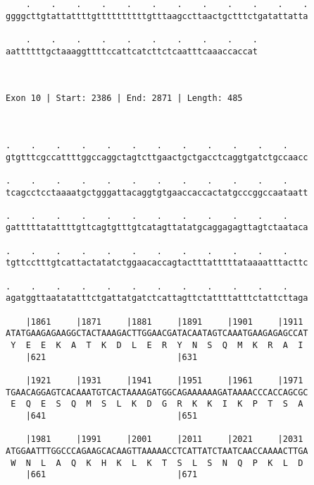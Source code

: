 \documentclass{article}
\begin{document}
\begin{Verbatim}
    .    .    .    .    .    .    .    .    .    .    .    .
ggggcttgtattattttgttttttttttgtttaagccttaactgctttctgatattatta
                                                            
    .    .    .    .    .    .    .    .    .    .
aattttttgctaaaggttttccattcatcttctcaatttcaaaccaccat
                                                  
                                                  
 
Exon 10 | Start: 2386 | End: 2871 | Length: 485



.    .    .    .    .    .    .    .    .    .    .    .    
gtgtttcgccattttggccaggctagtcttgaactgctgacctcaggtgatctgccaacc
                                                            
.    .    .    .    .    .    .    .    .    .    .    .    
tcagcctcctaaaatgctgggattacaggtgtgaaccaccactatgcccggccaataatt
                                                            
.    .    .    .    .    .    .    .    .    .    .    .    
gatttttatattttgttcagtgtttgtcatagttatatgcaggagagttagtctaataca
                                                            
.    .    .    .    .    .    .    .    .    .    .    .    
tgttcctttgtcattactatatctggaacaccagtactttatttttataaaatttacttc
                                                            
.    .    .    .    .    .    .    .    .    .    .    .    
agatggttaatatatttctgattatgatctcattagttctattttatttctattcttaga
                                                            
    |1861     |1871     |1881     |1891     |1901     |1911 
ATATGAAGAGAAGGCTACTAAAGACTTGGAACGATACAATAGTCAAATGAAGAGAGCCAT
 Y  E  E  K  A  T  K  D  L  E  R  Y  N  S  Q  M  K  R  A  I 
    |621                          |631                      
  
    |1921     |1931     |1941     |1951     |1961     |1971 
TGAACAGGAGTCACAAATGTCACTAAAAGATGGCAGAAAAAAGATAAAACCCACCAGCGC
 E  Q  E  S  Q  M  S  L  K  D  G  R  K  K  I  K  P  T  S  A 
    |641                          |651                      
  
    |1981     |1991     |2001     |2011     |2021     |2031 
ATGGAATTTGGCCCAGAAGCACAAGTTAAAAACCTCATTATCTAATCAACCAAAACTTGA
 W  N  L  A  Q  K  H  K  L  K  T  S  L  S  N  Q  P  K  L  D 
    |661                          |671                      
  

\end{Verbatim}
\end{document}
